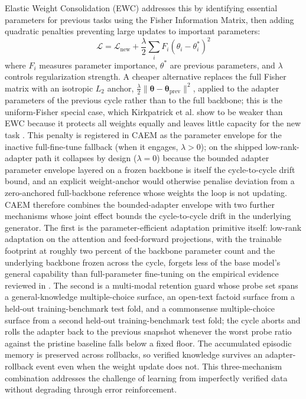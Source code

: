 Elastic Weight Consolidation (EWC) \cite{doi:10.1073/pnas.1611835114} addresses this by identifying essential parameters for previous tasks using the Fisher Information Matrix, then adding quadratic penalties preventing large updates to important parameters:
\begin{equation}
\mathcal{L} = \mathcal{L}_{\text{new}} + \frac{\lambda}{2} \sum_{i} F_i (\theta_i - \theta_i^*)^2
\end{equation}
where $F_i$ measures parameter importance, $\theta^*$ are previous parameters, and $\lambda$ controls regularization strength. A cheaper alternative replaces the full Fisher matrix with an isotropic $L_2$ anchor, $\frac{\lambda}{2}\lVert \boldsymbol{\theta} - \boldsymbol{\theta}_{\text{prev}} \rVert^2$, applied to the adapter parameters of the previous cycle rather than to the full backbone; this is the uniform-Fisher special case, which Kirkpatrick et al. show to be weaker than EWC because it protects all weights equally and leaves little capacity for the new task \cite{doi:10.1073/pnas.1611835114}. This penalty is registered in CAEM as the parameter envelope for the inactive full-fine-tune fallback (when it engages, $\lambda > 0$); on the shipped low-rank-adapter path it collapses by design ($\lambda = 0$) because the bounded adapter parameter envelope layered on a frozen backbone is itself the cycle-to-cycle drift bound, and an explicit weight-anchor would otherwise penalise deviation from a zero-anchored full-backbone reference whose weights the loop is not updating. CAEM therefore combines the bounded-adapter envelope with two further mechanisms whose joint effect bounds the cycle-to-cycle drift in the underlying generator. The first is the parameter-efficient adaptation primitive itself: low-rank adaptation \cite{hu2022lora} on the attention and feed-forward projections, with the trainable footprint at roughly two percent of the backbone parameter count and the underlying backbone frozen across the cycle, forgets less of the base model's general capability than full-parameter fine-tuning on the empirical evidence reviewed in . The second is a multi-modal retention guard whose probe set spans a general-knowledge multiple-choice surface, an open-text factoid surface from a held-out training-benchmark test fold, and a commonsense multiple-choice surface from a second held-out training-benchmark test fold; the cycle aborts and rolls the adapter back to the previous snapshot whenever the worst probe ratio against the pristine baseline falls below a fixed floor. The accumulated episodic memory is preserved across rollbacks, so verified knowledge survives an adapter-rollback event even when the weight update does not. This three-mechanism combination addresses the challenge of learning from imperfectly verified data without degrading through error reinforcement.

